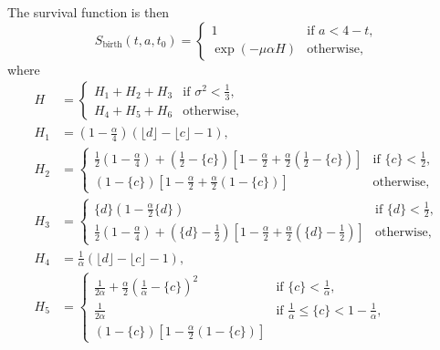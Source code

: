 \documentclass{jpmarticle}
\begin{document}
The survival function is then
\begin{equation}
  S_{\text{birth}}(t, a, t_0) =
  \begin{cases}
    1 & \text{if $a < 4 - t$},
    \\
    \exp(-\mu \alpha H) & \text{otherwise},
  \end{cases}
\end{equation}
where
\begin{align}
  H &=
  \begin{cases}
    H_1 + H_2  + H_3
    & \text{if $\sigma^2 < \frac{1}{3}$},
    \\
    H_4 + H_5 + H_6
    & \text{otherwise},
  \end{cases}
  \\
  H_1 &= \left(1 - \frac{\alpha}{4}\right)
  \left(\lfloor d \rfloor - \lfloor c \rfloor - 1\right),
  \\
  H_2 &=
  \begin{cases}
    \frac{1}{2} \left(1 - \frac{\alpha}{4}\right)
    + \left(\frac{1}{2} - \{c\}\right)
    \left[1 - \frac{\alpha}{2}
      + \frac{\alpha}{2} \left(\frac{1}{2} - \{c\}\right)\right]
    & \text{if $\{c\} < \frac{1}{2}$},
    \\
    \left(1 - \{c\}\right)
    \left[1 - \frac{\alpha}{2} + \frac{\alpha}{2} \left(1 - \{c\}\right)\right]
    & \text{otherwise},
  \end{cases}
  \\
  H_3 &=
  \begin{cases}
    \{d\}\left(1 - \frac{\alpha}{2} \{d\}\right)
    & \text{if $\{d\} < \frac{1}{2}$},
    \\
    \frac{1}{2} \left(1 - \frac{\alpha}{4}\right)
    + \left(\{d\} - \frac{1}{2}\right)
    \left[1 - \frac{\alpha}{2}
      + \frac{\alpha}{2} \left(\{d\} - \frac{1}{2}\right)\right]
    & \text{otherwise},
    \end{cases}
  \\
  H_4 &= \frac{1}{\alpha}
  \left(\lfloor d \rfloor - \lfloor c \rfloor - 1\right),
  \\
  H_5 &=
  \begin{cases}
    \frac{1}{2 \alpha}
    + \frac{\alpha}{2} \left(\frac{1}{\alpha} - \{c\}\right)^2
    & \text{if $\{c\} < \frac{1}{\alpha}$},
    \\
    \frac{1}{2 \alpha}
    & \text{if $\frac{1}{\alpha} \leq \{c\} < 1 - \frac{1}{\alpha}$},
    \\
    \left(1 - \{c\}\right) \left[1 -
      \frac{\alpha}{2} \left(1 - \{c\}\right)\right]

\end{cases}
\end{align}
\end{document}
